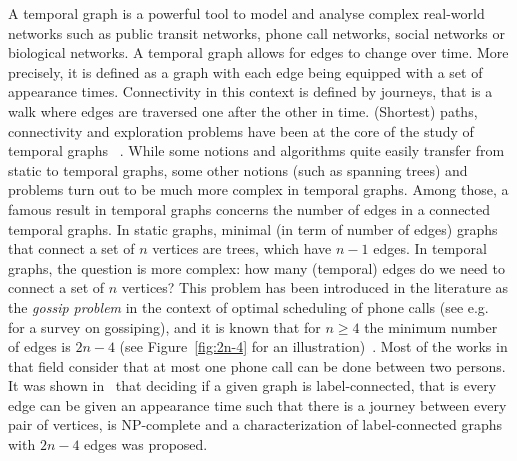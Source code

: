 \documentclass[11pt]{article}%
\begin{document}
A temporal graph is a powerful tool to model and analyse complex real-world networks such as public transit networks, phone call networks, social networks or biological networks. A temporal graph allows for edges to change over time. More precisely, it is defined as a graph with each edge being equipped with a set of appearance times. Connectivity in this context is defined by journeys, that is a walk where edges are traversed one after the other in time. (Shortest) paths, connectivity and exploration problems have been at the core of the study of temporal graphs ~\cite{bellitto2026,buixuan2003,bumpus2023,dreyfus1969,kempe2002,othon2016,wu2016}. While some notions and algorithms quite easily transfer from static to temporal graphs, some other notions (such as spanning trees) and problems turn out to be much more complex in temporal graphs. Among those, a famous result in temporal graphs concerns the number of edges in a connected temporal graphs. In static graphs, minimal (in term of number of edges) graphs that connect a set of $n$ vertices are trees, which have $n-1$ edges. In temporal graphs, the question is more complex: how many (temporal) edges do we need to connect a set of $n$ vertices? This problem has been introduced in the literature as the {\it gossip problem} in the context of optimal scheduling of phone calls (see e.g.~\cite{Hedetniemi1988} for a survey on gossiping), and it is known that for $n\geq 4$ the minimum number of edges is $2n-4$ (see Figure~\ref{fig:2n-4} for an illustration)~\cite{Bumby1981,Hajnal1972}. Most of the works in that field consider that at most one phone call can be done between two persons. It was shown in~\cite{Gobel1991} that deciding if a given graph is label-connected, that is every edge can be given an appearance time such that there is a journey between every pair of vertices, is NP-complete and a characterization of label-connected graphs with $2n-4$ edges was proposed. 
\end{document}
